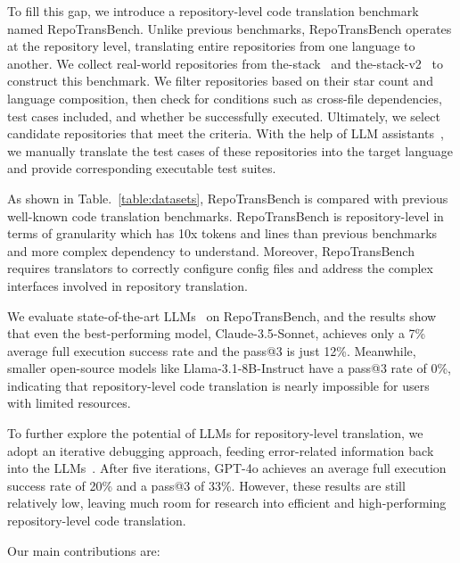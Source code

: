 To fill this gap, we introduce a repository-level code translation benchmark named RepoTransBench. Unlike previous benchmarks, RepoTransBench operates at the repository level, translating entire repositories from one language to another. We collect real-world repositories from the-stack~\cite{the-stack} and the-stack-v2~\cite{the-stack-v2} to construct this benchmark. We filter repositories based on their star count and language composition, then check for conditions such as cross-file dependencies, test cases included, and whether be successfully executed. Ultimately, we select candidate repositories that meet the criteria. With the help of LLM assistants~\cite{openai2023gpt4,Claude,deepseekv2}, we manually translate the test cases of these repositories into the target language and provide corresponding executable test suites.

As shown in Table.~\ref{table:datasets}, RepoTransBench is compared with previous well-known code translation benchmarks. RepoTransBench is repository-level in terms of granularity which has 10x tokens and lines than previous benchmarks and more complex dependency to understand. Moreover, RepoTransBench requires translators to correctly configure config files and address the complex interfaces involved in repository translation.

We evaluate state-of-the-art LLMs~\cite{openai2023gpt4,Claude,deepseekv2,llama3} on RepoTransBench, and the results show that even the best-performing model, Claude-3.5-Sonnet, achieves only a 7\% average full execution success rate and the pass@3 is just 12\%. Meanwhile, smaller open-source models like Llama-3.1-8B-Instruct have a pass@3 rate of 0\%, indicating that repository-level code translation is nearly impossible for users with limited resources.

To further explore the potential of LLMs for repository-level translation, we adopt an iterative debugging approach, feeding error-related information back into the LLMs~\cite{pan2024lost}. After five iterations, GPT-4o achieves an average full execution success rate of 20\% and a pass@3 of 33\%. However, these results are still relatively low, leaving much room for research into efficient and high-performing repository-level code translation.

Our main contributions are:

